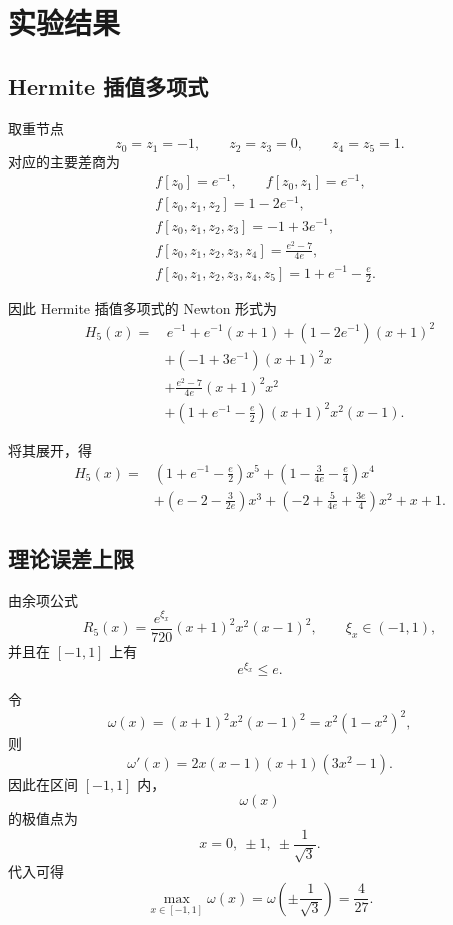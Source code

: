 \documentclass[12pt,a4paper]{ctexart}
\begin{document}
\section{实验结果}

\subsection{Hermite 插值多项式}

取重节点
\[
z_0=z_1=-1,\qquad z_2=z_3=0,\qquad z_4=z_5=1.
\]
对应的主要差商为
\[
\begin{aligned}
&f[z_0]=e^{-1},\qquad f[z_0,z_1]=e^{-1},\\
&f[z_0,z_1,z_2]=1-2e^{-1},\\
&f[z_0,z_1,z_2,z_3]=-1+3e^{-1},\\
&f[z_0,z_1,z_2,z_3,z_4]=\frac{e^2-7}{4e},\\
&f[z_0,z_1,z_2,z_3,z_4,z_5]=1+e^{-1}-\frac{e}{2}.
\end{aligned}
\]

因此 Hermite 插值多项式的 Newton 形式为
\[
\begin{aligned}
H_5(x)=&\,e^{-1}+e^{-1}(x+1)+(1-2e^{-1})(x+1)^2 \\
&+(-1+3e^{-1})(x+1)^2x \\
&+\frac{e^2-7}{4e}(x+1)^2x^2 \\
&+\left(1+e^{-1}-\frac{e}{2}\right)(x+1)^2x^2(x-1).
\end{aligned}
\]

将其展开，得
\[
\begin{aligned}
H_5(x)=&\left(1+e^{-1}-\frac{e}{2}\right)x^5
 +\left(1-\frac{3}{4e}-\frac{e}{4}\right)x^4\\
&+\left(e-2-\frac{3}{2e}\right)x^3
+\left(-2+\frac{5}{4e}+\frac{3e}{4}\right)x^2+x+1.
\end{aligned}
\]

\subsection{理论误差上限}

由余项公式
\[
R_5(x)=\frac{e^{\xi_x}}{720}(x+1)^2x^2(x-1)^2,
\qquad \xi_x\in(-1,1),
\]
并且在 $[-1,1]$ 上有
\[
e^{\xi_x}\le e.
\]

令
\[
\omega(x)=(x+1)^2x^2(x-1)^2=x^2(1-x^2)^2,
\]
则
\[
\omega'(x)=2x(x-1)(x+1)(3x^2-1).
\]
因此在区间 $[-1,1]$ 内，
\[
\omega(x)
\]
的极值点为
\[
x=0,\ \pm 1,\ \pm \frac{1}{\sqrt{3}}.
\]
代入可得
\[
\max_{x\in[-1,1]}\omega(x)=\omega\!\left(\pm\frac{1}{\sqrt{3}}\right)=\frac{4}{27}.
\]
\end{document}
